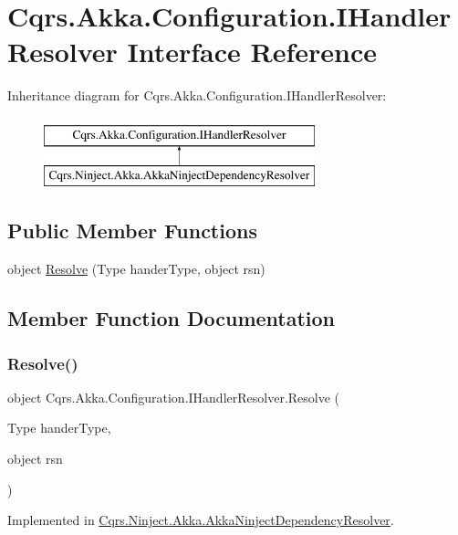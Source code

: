 \hypertarget{interfaceCqrs_1_1Akka_1_1Configuration_1_1IHandlerResolver}{}\section{Cqrs.\+Akka.\+Configuration.\+I\+Handler\+Resolver Interface Reference}
\label{interfaceCqrs_1_1Akka_1_1Configuration_1_1IHandlerResolver}
Inheritance diagram for Cqrs.\+Akka.\+Configuration.\+I\+Handler\+Resolver\+:\begin{figure}[H]
\begin{center}
\leavevmode
\includegraphics[height=2.000000cm]{interfaceCqrs_1_1Akka_1_1Configuration_1_1IHandlerResolver}
\end{center}
\end{figure}
\subsection*{Public Member Functions}
\begin{DoxyCompactItemize}
\item 
object \hyperlink{interfaceCqrs_1_1Akka_1_1Configuration_1_1IHandlerResolver_abae10eed2d92eb3f2831c5eba7e3c2d3}{Resolve} (Type hander\+Type, object rsn)
\end{DoxyCompactItemize}


\subsection{Member Function Documentation}
\mbox{\label{interfaceCqrs_1_1Akka_1_1Configuration_1_1IHandlerResolver_abae10eed2d92eb3f2831c5eba7e3c2d3}} 
\subsubsection{\texorpdfstring{Resolve()}{Resolve()}}
{\footnotesize\ttfamily object Cqrs.\+Akka.\+Configuration.\+I\+Handler\+Resolver.\+Resolve (\begin{DoxyParamCaption}\item[{Type}]{hander\+Type,  }\item[{object}]{rsn }\end{DoxyParamCaption})}



Implemented in \hyperlink{classCqrs_1_1Ninject_1_1Akka_1_1AkkaNinjectDependencyResolver_ab860d9bcf44b62098a8df91bbcb5013d}{Cqrs.\+Ninject.\+Akka.\+Akka\+Ninject\+Dependency\+Resolver}.

